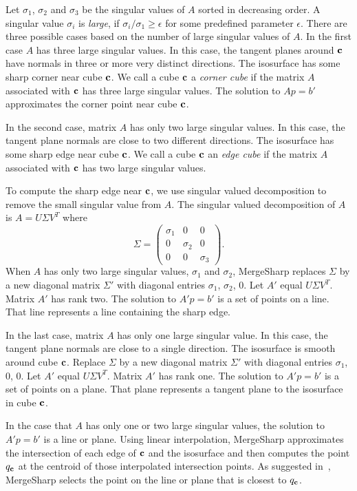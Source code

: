 Let $\sigma_1$, $\sigma_2$ and $\sigma_3$ be the singular values of $A$
sorted in decreasing order.
A singular value $\sigma_i$ is {\em large},
if $\sigma_i/\sigma_1 \ge \epsilon$ for some predefined parameter $\epsilon$.
There are three possible cases based on the number of large singular values
of $A$.
In the first case $A$ has three large singular values.
In this case, the tangent planes around $\mathbf{c}$ have normals in three or more
very distinct directions.
The isosurface has some sharp corner near cube $\mathbf{c}$.
We call a cube $\mathbf{c}$ a {\em corner cube} if the matrix $A$ associated
with $\mathbf{c}$ has three large singular values.
The solution to $A p = b'$ approximates the corner point near cube $\mathbf{c}$.

In the second case, matrix $A$ has only two large singular values.
In this case, 
the tangent plane normals are close to two different directions.
The isosurface has some sharp edge near cube $\mathbf{c}$.
We call a cube $\mathbf{c}$ an {\em edge cube} if the matrix $A$ associated
with $\mathbf{c}$ has two large singular values.

To compute the sharp edge near $\mathbf{c}$,
we use singular valued decomposition to remove the small singular value
from $A$.
The singular valued decomposition of $A$ is $A = U \Sigma V^T$
where
\begin{equation*}
\Sigma = \left (
\begin{array}{ccc}
\sigma_1 & 0 & 0 \\
0 & \sigma_2 & 0 \\
0 & 0 & \sigma_3
\end{array}
\right )
.
\end{equation*}
When $A$ has only two large singular values, $\sigma_1$ and $\sigma_2$,
MergeSharp replaces $\Sigma$ by a new diagonal matrix $\Sigma'$
with diagonal entries $\sigma_1$, $\sigma_2$, 0.
Let $A'$ equal $U \Sigma V^T$.
Matrix $A'$ has rank two.
The solution to $A' p = b'$ is a set of points on a line.
That line represents a line containing the sharp edge.

In the last case,
matrix $A$ has only one large singular value.
In this case, the tangent plane normals are close to a single direction.
The isosurface is smooth around cube $\mathbf{c}$.
Replace $\Sigma$ by a new diagonal matrix $\Sigma'$
with diagonal entries $\sigma_1$, 0, 0.
Let $A'$ equal $U \Sigma V^T$.
Matrix $A'$ has rank one.
The solution to $A' p = b'$ is a set of points on a plane.
That plane represents a tangent plane to the isosurface in cube $\mathbf{c}$.

In the case that $A$ has only one or two large singular values,
the solution to $A' p = b'$ is a line or plane.
Using linear interpolation,
MergeSharp approximates the intersection of each edge of $\mathbf{c}$
and the isosurface and then computes the point $q_{\mathbf{c}}$
at the centroid of those interpolated intersection points.
As suggested in~\cite{sw-dcss-02},
MergeSharp selects the point on the line or plane that is closest to $q_{\mathbf{c}}$.


